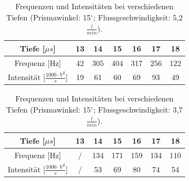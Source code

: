 \begin{table}
    \centering
    \caption{Frequenzen und Intensitäten bei verschiedenen Tiefen (Prismawinkel: 15$^{\circ}$; Flussgeschwindigkeit: 5,2$\frac{l}{min}$).}
    \label{tab:70}

    \begin{tabular}{c | c c c c c c}
    \toprule
    Tiefe [$\mu s$] & 13 & 14 & 15 & 16 & 17 & 18 \\
    \midrule
    Frequenz [Hz]                           & 42  & 305 & 404  & 317  & 256 & 122 \\
    Intensität [$\frac{1000 \cdot V^2}{s}$] & 19  & 61  & 60   & 69   & 93  & 49  \\
    \bottomrule

    \end{tabular}
\end{table}

\begin{table}
    \centering
    \caption{Frequenzen und Intensitäten bei verschiedenen Tiefen (Prismawinkel: 15$^{\circ}$; Flussgeschwindigkeit: 3,7$\frac{l}{min}$).}
    \label{tab:45}

    \begin{tabular}{c | c c c c c c}
    \toprule
    Tiefe [$\mu s$] & 13 & 14 & 15 & 16 & 17 & 18 \\
    \midrule
    Frequenz [Hz]                           & /  & 134 & 171  & 159  & 134 & 110 \\
    Intensität [$\frac{1000 \cdot V^2}{s}$] & /  & 53  & 69   & 80   & 74  & 54  \\
    \bottomrule

    \end{tabular}
\end{table}
